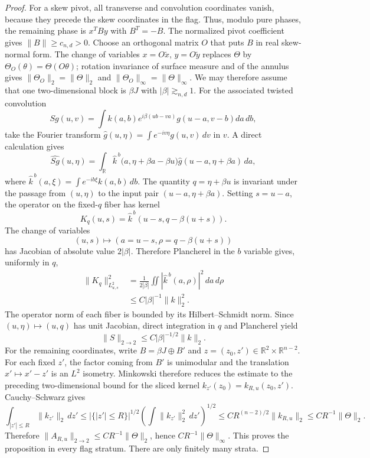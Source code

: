 \documentclass[11pt]{article}
\numberwithin{equation}{section}
\theoremstyle{remark}
\theoremstyle{definition}
\newcommand{\R}{\mathbb R}
\newcommand{\norm}[1]{\lVert #1\rVert}
\begin{document}
\begin{proof}
For a skew pivot, all transverse and convolution coordinates vanish,
because they precede the skew coordinates in the flag.  Thus, modulo pure
phases, the remaining phase is $x^TBy$ with $B^T=-B$.  The normalized
pivot coefficient gives $\norm B\ge c_{n,d}>0$.  Choose an orthogonal
matrix $O$ that puts $B$ in real skew-normal form.  The change of variables
$x=O\widetilde x$, $y=O\widetilde y$ replaces $\Theta$ by
$\Theta_O(\theta)=\Theta(O\theta)$; rotation invariance of surface measure
and of the annulus gives
$\norm{\Theta_O}_2=\norm\Theta_2$ and
$\norm{\Theta_O}_\infty=\norm\Theta_\infty$.  We may therefore assume
that one two-dimensional block is $\beta J$ with
$|\beta|\gtrsim_{n,d}1$.  For the associated twisted convolution
\[
 Sg(u,v)=\int k(a,b)e^{i\beta(ub-va)}g(u-a,v-b)da\,db,
\]
take the Fourier transform
$\widehat g(u,\eta)=\int e^{-iv\eta}g(u,v)\,dv$ in $v$.  A direct
calculation gives
\[
 \widehat{Sg}(u,\eta)
 =\int_{\mathbb R}
  \widehat k^{\,b}\bigl(a,\eta+\beta a-\beta u\bigr)
  \widehat g(u-a,\eta+\beta a)\,da,
\]
where
$\widehat k^{\,b}(a,\xi)=\int e^{-ib\xi}k(a,b)\,db$.
The quantity $q=\eta+\beta u$ is invariant under the passage from
$(u,\eta)$ to the input pair $(u-a,\eta+\beta a)$.  Setting $s=u-a$,
the operator on the fixed-$q$ fiber has kernel
\[
 K_q(u,s)
 =\widehat k^{\,b}(u-s,q-\beta(u+s)).
\]
The change of variables
\[
 (u,s)\longmapsto
 (a=u-s,\rho=q-\beta(u+s))
\]
has Jacobian of absolute value $2|\beta|$.  Therefore Plancherel in the
$b$ variable gives, uniformly in $q$,
\[
\begin{split}
 \norm{K_q}_{L^2_{u,s}}^2
 &=\frac1{2|\beta|}
   \iint|\widehat k^{\,b}(a,\rho)|^2\,da\,d\rho\\
 &\le C|\beta|^{-1}\norm k_2^2.
\end{split}
\]
The operator norm of each fiber is bounded by its Hilbert--Schmidt norm.
Since $(u,\eta)\mapsto(u,q)$ has unit Jacobian, direct integration in $q$
and Plancherel yield
\[
 \norm S_{2\to2}\le C|\beta|^{-1/2}\norm k_2.
\]
For the remaining coordinates, write $B=\beta J\oplus B'$ and
$z=(z_0,z')\in\R^2\times\R^{n-2}$.  For each fixed $z'$, the factor coming
from $B'$ is unimodular and the translation
$x'\mapsto x'-z'$ is an $L^2$ isometry.  Minkowski therefore reduces the
estimate to the preceding two-dimensional bound for the sliced kernel
$k_{z'}(z_0)=k_{R,u}(z_0,z')$.  Cauchy--Schwarz gives
\[
\int_{|z'|\le R}\norm{k_{z'}}_2\,dz'
\le |\{|z'|\le R\}|^{1/2}
 \left(\int\norm{k_{z'}}_2^2\,dz'\right)^{1/2}
\le CR^{(n-2)/2}\norm{k_{R,u}}_2
\le CR^{-1}\norm\Theta_2.
\]
Therefore
$\norm{A_{R,u}}_{2\to2}\le CR^{-1}\norm\Theta_2$, hence
$CR^{-1}\norm\Theta_\infty$.  This proves the proposition in every flag
stratum.  There are only finitely many strata.
\end{proof}
\end{document}
